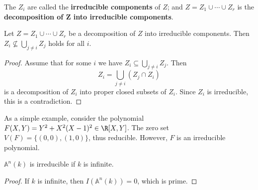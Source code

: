 The $Z_i$ are called the \textbf{irreducible components} of $Z$; and $Z=Z_1\cup\cdots\cup Z_r$ is the \textbf{decomposition of $\bm{Z}$ into irreducible components}.
\begin{proposition}
Let $Z=Z_1\cup\cdots\cup Z_r$ be a decomposition of $Z$ into irreducible components. Then $Z_i\nsubseteq\bigcup_{j\neq i}Z_j$ holds for all $i$.
\end{proposition}
\begin{proof}
Assume that for some $i$ we have $Z_i\subseteq\bigcup_{j\neq i}Z_j$. Then
\[Z_i=\bigcup_{j\neq i}(Z_j\cap Z_i)\]
is a decomposition of $Z_i$ into proper closed subsets of $Z_i$. Since $Z_i$ is irreducible, this is a contradiction.
\end{proof}
\begin{example}
As a simple example, consider the polynomial $F(X,Y)=Y^2+X^2(X-1)^2\in\R[X,Y]$. The zero set $V(F)=\{(0,0),(1,0)\}$, thus reducible. However, $F$ is an irreducible polynomial.
\end{example}
\begin{proposition}
$\mathbb{A}^n(k)$ is irreducible if $k$ is infinite.
\end{proposition}
\begin{proof}
If $k$ is infinite, then $I(\mathbb{A}^n(k))=0$, which is prime.
\end{proof}
